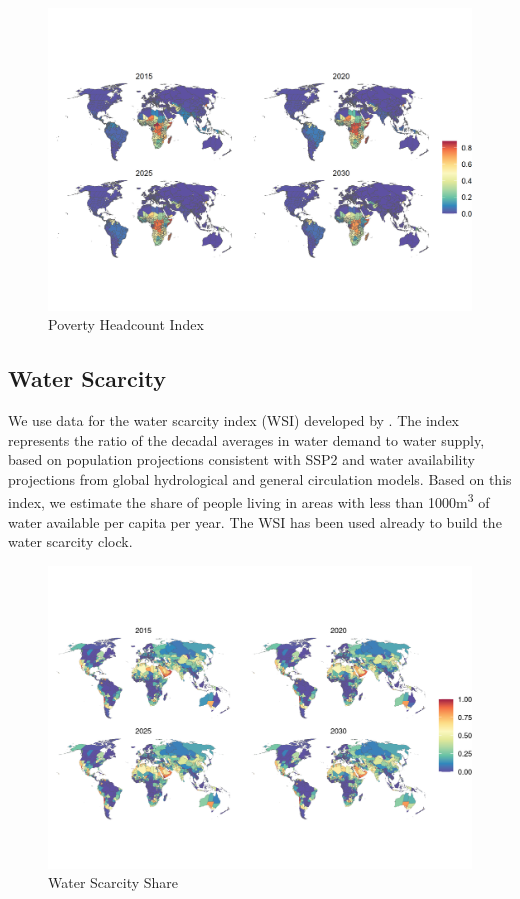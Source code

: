 \documentclass{article}
\begin{document}
\begin{figure}[H]
  \centering
  \includegraphics[width=\linewidth]{img/covars/hci.png}
  \caption{Poverty Headcount Index}
\end{figure}

\pagebreak
\subsection{Water Scarcity}
We use data for the water scarcity index (WSI) developed by \citep{greve2018global}. The index represents the ratio of the decadal averages in water demand to water supply, based on population projections consistent with SSP2 and water availability projections from global hydrological and general circulation models.  Based on this index, we estimate the share of people living in areas with less than 1000m\textsuperscript{3} of water available per capita per year. The WSI has been used already to build the water scarcity clock.

\begin{figure}[H]
  \centering
  \includegraphics[width=\linewidth]{img/covars/ws_share.png}
  \caption{Water Scarcity Share}
\end{figure}
\end{document}

